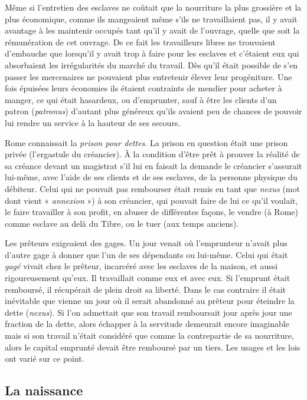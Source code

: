 Même si l'entretien des esclaves ne coûtait que la nourriture la
plus grossière et la plus économique, comme ils mangeaient même s'ils
ne travaillaient pas, il y avait avantage à les maintenir occupés tant qu'il y
avait de l'ouvrage, quelle que soit la rémunération de cet ouvrage. De ce
fait les travailleurs libres ne trouvaient d'embauche que lorsqu'il y avait
trop à faire pour les esclaves et c'étaient eux qui absorbaient les irrégularités
du marché du travail. Dès qu'il était possible de s'en passer les mercenaires
ne pouvaient plus entretenir élever leur progéniture. Une fois
épuisées leurs économies ils étaient contraints de mendier pour acheter à
manger, ce qui était hasardeux, ou d'emprunter, sauf à être les clients
d'un patron (\emph{patronus}) d'autant plus généreux qu'ils avaient peu de chances
de pouvoir lui rendre un service à la hauteur de ses secours.

Rome connaissait la \emph{prison pour dettes}. La prison en question était
une prison privée (l'ergastule du créancier). À la condition d'être prêt à
prouver la réalité de sa créance devant un magistrat s'il lui en faisait la
demande le créancier s'assurait lui-même, avec l'aide de ses clients et de
ses esclaves, de la personne physique du débiteur. Celui qui ne pouvait
pas rembourser était remis en tant que \emph{nexus} (mot dont vient « \emph{annexion} »)
à son créancier, qui pouvait faire de lui ce qu'il voulait, le faire travailler à
son profit, en abuser de différentes façons, le vendre (à Rome) comme
esclave au delà du Tibre, ou le tuer (aux temps anciens).

Les prêteurs exigeaient des gages. Un jour venait où l'emprunteur
n'avait plus d'autre gage à donner que l'un de ses dépendants ou lui-même.
Celui qui était \emph{gagé} vivait chez le prêteur, incarcéré avec les esclaves
de la maison, et aussi rigoureusement qu'eux. Il travaillait comme eux
et avec eux. Si l'emprunt était remboursé, il récupérait de plein droit sa
liberté. Dans le cas contraire il était inévitable que vienne un jour où il
serait abandonné au prêteur pour éteindre la dette (\emph{nexus}). Si l'on admettait
que son travail remboursait jour après jour une fraction de la dette,
alors échapper à la servitude demeurait encore imaginable mais si son
travail n'était considéré que comme la contrepartie de sa nourriture, alors
le capital emprunté devait être remboursé par un tiers. Les usages et les
lois ont varié sur ce point.

\subsection{La naissance}

